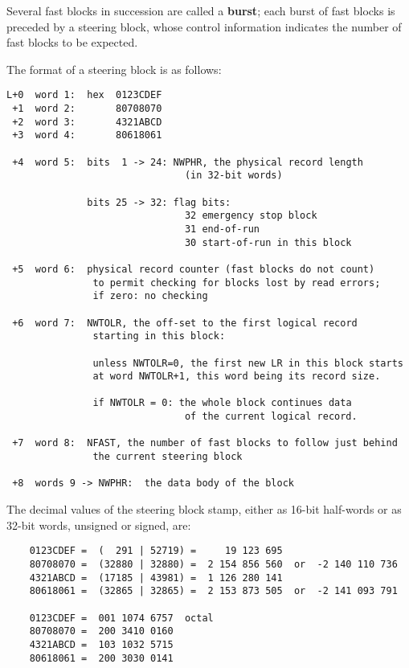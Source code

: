 Several fast blocks in succession are called a {\bf burst};
each burst of fast blocks is preceded by a steering block,
whose control information indicates the number of fast blocks
to be expected.

The format of a steering block is as follows:

\begin{verbatim}
L+0  word 1:  hex  0123CDEF
 +1  word 2:       80708070
 +2  word 3:       4321ABCD
 +3  word 4:       80618061

 +4  word 5:  bits  1 -> 24: NWPHR, the physical record length
                               (in 32-bit words)

              bits 25 -> 32: flag bits:
                               32 emergency stop block
                               31 end-of-run
                               30 start-of-run in this block

 +5  word 6:  physical record counter (fast blocks do not count)
               to permit checking for blocks lost by read errors;
               if zero: no checking

 +6  word 7:  NWTOLR, the off-set to the first logical record
               starting in this block:

               unless NWTOLR=0, the first new LR in this block starts
               at word NWTOLR+1, this word being its record size.

               if NWTOLR = 0: the whole block continues data
                               of the current logical record.

 +7  word 8:  NFAST, the number of fast blocks to follow just behind
               the current steering block

 +8  words 9 -> NWPHR:  the data body of the block
\end{verbatim}

The decimal values of the steering block stamp,
either as 16-bit half-words or as 32-bit words, unsigned or signed,
are:

\begin{verbatim}
    0123CDEF =  (  291 | 52719) =     19 123 695
    80708070 =  (32880 | 32880) =  2 154 856 560  or  -2 140 110 736
    4321ABCD =  (17185 | 43981) =  1 126 280 141
    80618061 =  (32865 | 32865) =  2 153 873 505  or  -2 141 093 791

    0123CDEF =  001 1074 6757  octal
    80708070 =  200 3410 0160
    4321ABCD =  103 1032 5715
    80618061 =  200 3030 0141
\end{verbatim}

